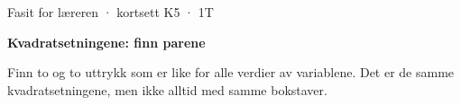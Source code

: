 \documentclass[11pt,a4paper]{article}
\begin{document}
\begin{minipage}[t]{0.8\linewidth}\vspace{0pt}
{\sffamily\small\color{dempet}Fasit for læreren · kortsett K5 · 1T}\par\vspace{0.25em}
{\fontsize{20}{24}\selectfont\bfseries Kvadratsetningene: finn parene}\par\vspace{0.5em}
Finn to og to uttrykk som er like for alle verdier av variablene. Det er de samme kvadratsetningene, men ikke alltid med samme bokstaver.\par{}
\end{minipage}\hfill
\begin{minipage}[t]{0.15\linewidth}\vspace{0pt}\raggedleft
{}
\end{minipage}\par\vspace{0.8em}
\end{document}
